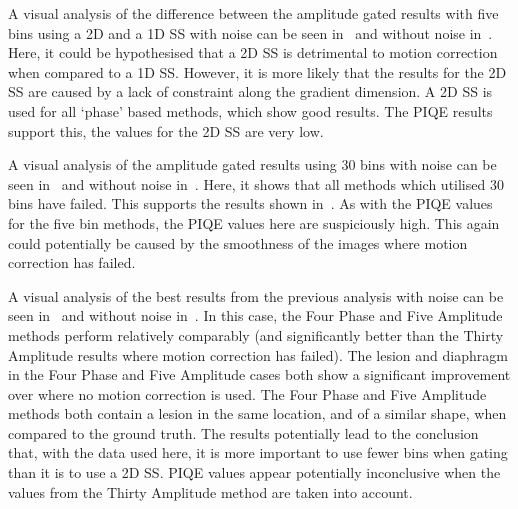             A visual analysis of the difference between the amplitude gated results with five bins using a \gls{2D} and a \gls{1D} \gls{SS} with noise can be seen in~ and without noise in~. Here, it could be hypothesised that a \gls{2D} \gls{SS} is detrimental to motion correction when compared to a \gls{1D} \gls{SS}. However, it is more likely that the results for the \gls{2D} \gls{SS} are caused by a lack of constraint along the gradient dimension. A \gls{2D} \gls{SS} is used for all `phase' based methods, which show good results. The \gls{PIQE} results support this, the values for the \gls{2D} \gls{SS} are very low.
            
            A visual analysis of the amplitude gated results using $30$ bins with noise can be seen in~ and without noise in~. Here, it shows that all methods which utilised $30$ bins have failed. This supports the results shown in~. As with the \gls{PIQE} values for the five bin methods, the \gls{PIQE} values here are suspiciously high. This again could potentially be caused by the smoothness of the images where motion correction has failed.
            
            A visual analysis of the best results from the previous analysis with noise can be seen in~ and without noise in~. In this case, the Four Phase and Five Amplitude methods perform relatively comparably (and significantly better than the Thirty Amplitude results where motion correction has failed). The lesion and diaphragm in the Four Phase and Five Amplitude cases both show a significant improvement over where no motion correction is used. The Four Phase and Five Amplitude methods both contain a lesion in the same location, and of a similar shape, when compared to the ground truth. The results potentially lead to the conclusion that, with the data used here, it is more important to use fewer bins when gating than it is to use a \gls{2D} \gls{SS}. \gls{PIQE} values appear potentially inconclusive when the values from the Thirty Amplitude method are taken into account.

